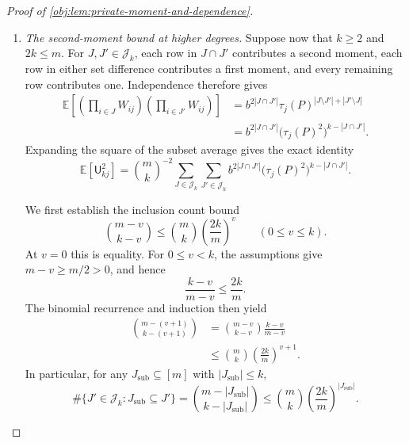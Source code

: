 \documentclass[11pt]{article}
\begin{document}
\begin{proof}[Proof of \cref{obj:lem:private-moment-and-dependence}]
\begin{enumerate}
\item \textit{The second-moment bound at higher degrees.}
Suppose now that \(k\ge2\) and \(2k\le m\). For
\(J,J'\in\mathcal J_k\), each row in \(J\cap J'\) contributes a second moment,
each row in either set difference contributes a first moment, and every
remaining row contributes one. Independence therefore gives
\[
\begin{aligned}
\mathbb E\left[
\left(\prod_{i\in J}W_{ij}\right)
\left(\prod_{i\in J'}W_{ij}\right)\right]
&=
b^{2|J\cap J'|}
\tau_j(P)^{|J\setminus J'|+|J'\setminus J|}\\
&=
b^{2|J\cap J'|}
\bigl(\tau_j(P)^2\bigr)^{k-|J\cap J'|}.
\end{aligned}
\]
Expanding the square of the subset average gives the exact identity
\[
\mathbb E[\mathsf U_{kj}^2]
=
\binom mk^{-2}
\sum_{J\in\mathcal J_k}\sum_{J'\in\mathcal J_k}
b^{2|J\cap J'|}
\bigl(\tau_j(P)^2\bigr)^{k-|J\cap J'|}.
\]

We first establish the inclusion count bound
\[
\binom{m-v}{k-v}
\le
\binom mk\left(\frac{2k}{m}\right)^v
\qquad(0\le v\le k).
\]
At \(v=0\) this is equality. For \(0\le v<k\), the assumptions give
\(m-v\ge m/2>0\), and hence
\[
\frac{k-v}{m-v}\le\frac{2k}{m}.
\]
The binomial recurrence and induction then yield
\[
\begin{aligned}
\binom{m-(v+1)}{k-(v+1)}
&=
\binom{m-v}{k-v}\frac{k-v}{m-v}\\
&\le
\binom mk\left(\frac{2k}{m}\right)^{v+1}.
\end{aligned}
\]
In particular, for any \(J_{\mathrm{sub}}\subseteq[m]\) with
\(|J_{\mathrm{sub}}|\le k\),
\[
\#\{J'\in\mathcal J_k:J_{\mathrm{sub}}\subseteq J'\}
=
\binom{m-|J_{\mathrm{sub}}|}{k-|J_{\mathrm{sub}}|}
\le
\binom mk
\left(\frac{2k}{m}\right)^{|J_{\mathrm{sub}}|}.
\]


\end{enumerate}
\end{proof}
\end{document}
